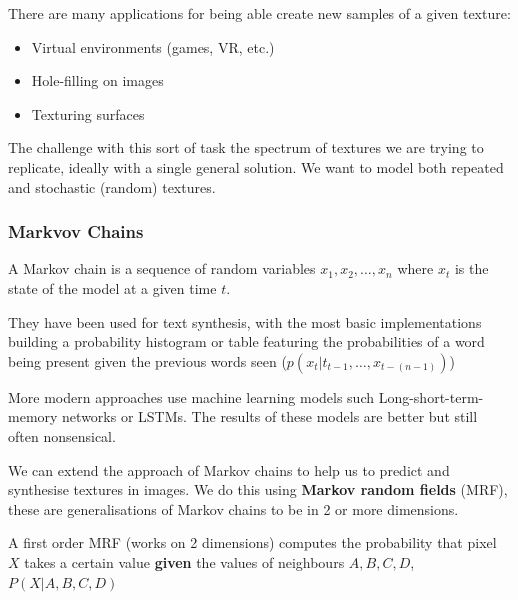 \documentclass{article}
\begin{document}
There are many applications for being able create new samples of a given texture:

\begin{itemize}
  \item Virtual environments (games, VR, etc.)
  \item Hole-filling on images
  \item Texturing surfaces
\end{itemize}

The challenge with this sort of task the spectrum of textures we are trying to replicate, ideally with a single general solution. We want to model both repeated and stochastic (random) textures.

\subsubsection{Markvov Chains}

A Markov chain is a sequence of random variables $x_{1}, x_{2}, \ldots, x_{n}$ where $x_{t}$ is the state of the model at a given time $t$.

They have been used for text synthesis, with the most basic implementations building a probability histogram or table featuring the probabilities of a word being present given the previous words seen ($p(x_{t} | t_{t-1},\ldots,x_{t-(n-1)})$)

More modern approaches use machine learning models such Long-short-term-memory networks or LSTMs. The results of these models are better but still often nonsensical.

We can extend the approach of Markov chains to help us to predict and synthesise textures in images. We do this using \textbf{Markov random fields} (MRF), these are generalisations of Markov chains to be in 2 or more dimensions.

A first order MRF (works on 2 dimensions) computes the probability that pixel $X$ takes a certain value \textbf{given} the values of neighbours $A,B,C,D$, $P(X | A,B,C,D)$

\begin{center}
\end{center}
\end{document}
